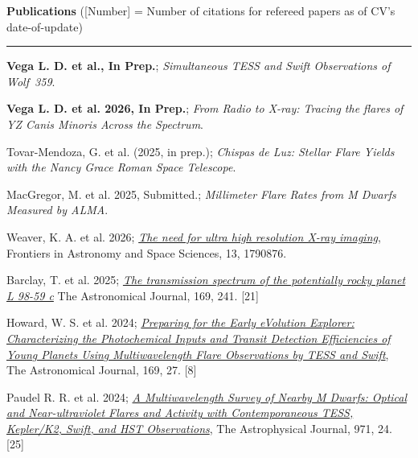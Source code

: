\documentclass[12pt]{article}
\begin{document}
\noindent
{\bf Publications} ([Number] = Number of citations for refereed papers as of CV's date-of-update) \\
\vspace{-10mm}
\begin{center}
\rule{\textwidth}{0.2mm}
\end{center}
\vspace{-3mm}
\noindent
\begin{etaremune}
\renewcommand\labelenumi{\bfseries\theenumi .}
\item {\bf Vega L. D. et al., In Prep.}; {\it Simultaneous TESS and Swift Observations of Wolf~359}.

\item {\bf Vega L. D. et al. 2026, In Prep.}; {\it From Radio to X-ray: Tracing the flares of YZ Canis Minoris Across the Spectrum}.

\item {Tovar-Mendoza, G. et al. (2025, in prep.)}; {\it Chispas de Luz: Stellar Flare Yields with the Nancy Grace Roman Space Telescope}.

\item {MacGregor, M. et al. 2025, Submitted.}; {\it Millimeter Flare Rates from M Dwarfs Measured by ALMA}.

\item {Weaver, K. A. et al. 2026}; \href{https://ui.adsabs.harvard.edu/abs/2026FrASS..1390876W/abstract}{\it The need for ultra high resolution X-ray imaging}, Frontiers in Astronomy and Space Sciences, 13, 1790876.

\item {Barclay, T. et al. 2025}; \href{https://ui.adsabs.harvard.edu/abs/2025AJ....169..241B/abstract}{\it The transmission spectrum of the potentially rocky planet L 98-59 c} The Astronomical Journal, 169, 241. [21]

\item {Howard, W. S. et al. 2024}; \href{https://ui.adsabs.harvard.edu/abs/2025AJ....169...27H/abstract}{\it Preparing for the Early eVolution Explorer: Characterizing the Photochemical Inputs and Transit Detection Efficiencies of Young Planets Using Multiwavelength Flare Observations by TESS and Swift}, The Astronomical Journal, 169, 27. [8]

\item {Paudel R. R. et al. 2024}; \href{https://ui.adsabs.harvard.edu/abs/2024ApJ...971...24P/abstract}{\it A Multiwavelength Survey of Nearby M Dwarfs: Optical and Near-ultraviolet Flares and Activity with Contemporaneous TESS, Kepler/K2, {\it Swift}, and HST Observations}, The Astrophysical Journal, 971, 24. [25]


\end{etaremune}
\end{document}
